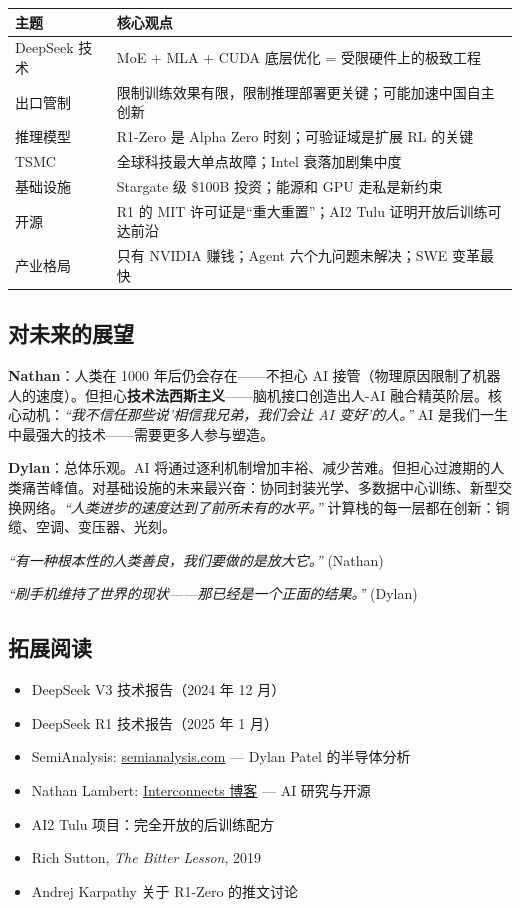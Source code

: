 \documentclass[a4paper]{article}
\begin{document}
\begin{table}[H]
\centering
\begin{tabular}{lp{9cm}}
\toprule
\textbf{主题} & \textbf{核心观点} \\
\midrule
DeepSeek 技术 & MoE + MLA + CUDA 底层优化 = 受限硬件上的极致工程 \\
出口管制 & 限制训练效果有限，限制推理部署更关键；可能加速中国自主创新 \\
推理模型 & R1-Zero 是 Alpha Zero 时刻；可验证域是扩展 RL 的关键 \\
TSMC & 全球科技最大单点故障；Intel 衰落加剧集中度 \\
基础设施 & Stargate 级 \$100B 投资；能源和 GPU 走私是新约束 \\
开源 & R1 的 MIT 许可证是``重大重置''；AI2 Tulu 证明开放后训练可达前沿 \\
产业格局 & 只有 NVIDIA 赚钱；Agent 六个九问题未解决；SWE 变革最快 \\
\bottomrule
\end{tabular}
\end{table}

\subsection{对未来的展望}

\textbf{Nathan}：人类在 1000 年后仍会存在——不担心 AI 接管（物理原因限制了机器人的速度）。但担心\textbf{技术法西斯主义}——脑机接口创造出人-AI 融合精英阶层。核心动机：\textit{``我不信任那些说'相信我兄弟，我们会让 AI 变好'的人。''} AI 是我们一生中最强大的技术——需要更多人参与塑造。

\textbf{Dylan}：总体乐观。AI 将通过逐利机制增加丰裕、减少苦难。但担心过渡期的人类痛苦峰值。对基础设施的未来最兴奋：协同封装光学、多数据中心训练、新型交换网络。\textit{``人类进步的速度达到了前所未有的水平。''} 计算栈的每一层都在创新：铜缆、空调、变压器、光刻。

\textit{``有一种根本性的人类善良，我们要做的是放大它。''} (Nathan)

\textit{``刷手机维持了世界的现状——那已经是一个正面的结果。''} (Dylan)

\subsection{拓展阅读}

\begin{itemize}
    \item DeepSeek V3 技术报告（2024 年 12 月）
    \item DeepSeek R1 技术报告（2025 年 1 月）
    \item SemiAnalysis: \href{https://semianalysis.com}{semianalysis.com} — Dylan Patel 的半导体分析
    \item Nathan Lambert: \href{https://www.interconnects.ai}{Interconnects 博客} — AI 研究与开源
    \item AI2 Tulu 项目：完全开放的后训练配方
    \item Rich Sutton, \textit{The Bitter Lesson}, 2019
    \item Andrej Karpathy 关于 R1-Zero 的推文讨论
\end{itemize}
\end{document}

